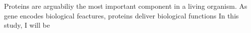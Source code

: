 Proteins are arguabiliy the most important component in a living organism. As gene encodes biological feactures, proteins deliver biological functions   In this study, I will be 